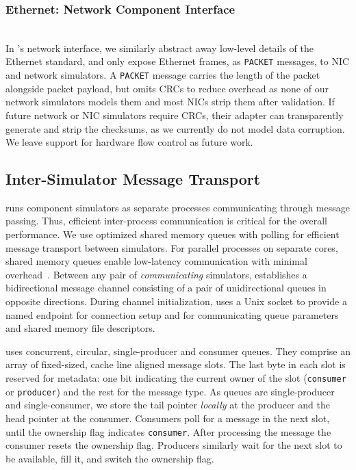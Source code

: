 \subsubsection{Ethernet: Network Component Interface} \hfill\\
\label{sssec:design:interface:nicnet}
In \sysname{}'s network interface, we similarly abstract away
low-level details of the Ethernet standard, and only expose Ethernet
frames, as \texttt{PACKET} messages, to NIC and network
simulators.
%
A \texttt{PACKET} message carries the length of the packet alongside
packet payload, but omits CRCs to reduce overhead as none of our
network simulators models them and most NICs strip them after
validation.
%
If future network or NIC simulators require CRCs, their \sysname adapter can
transparently generate and strip the checksums, as we currently do not model
data corruption.
%
We leave support for hardware flow control as future work.




\subsection{Inter-Simulator Message Transport}
\label{ssec:design:transport}
\sysname runs component simulators as separate processes communicating
through message passing.
%
Thus, efficient inter-process communication is critical for the overall
performance.
%
We use optimized shared memory queues with polling for efficient
message transport between simulators.
%
For parallel processes on separate cores, shared memory queues
enable low-latency communication with minimal
overhead~\cite{bershad:urpc,baumann:barrelfish}.
%
Between any pair of \emph{communicating} simulators, \sysname
establishes a bidirectional message channel consisting of a pair of
unidirectional queues in opposite directions.
%
During channel initialization, \sysname uses a Unix socket to provide a named
endpoint for connection setup and for communicating queue parameters and shared
memory file descriptors.

\sysname uses concurrent, circular, single-producer and consumer queues.
%
They comprise an array of fixed-sized, cache line aligned message
slots.
%
The last byte in each slot is reserved for metadata:
one bit indicating the current owner of the slot (\texttt{consumer} or
\texttt{producer}) and the rest for the message type.
%
As queues are single-producer and single-consumer, we store the tail pointer
\textit{locally} at the producer and the head pointer at the consumer.
%
Consumers poll for a message in the next slot, until the ownership
flag indicates \texttt{consumer}.
%
After processing the message the consumer resets the ownership flag.
%
Producers similarly wait for the next slot to be available, fill it,
and switch the ownership flag.


